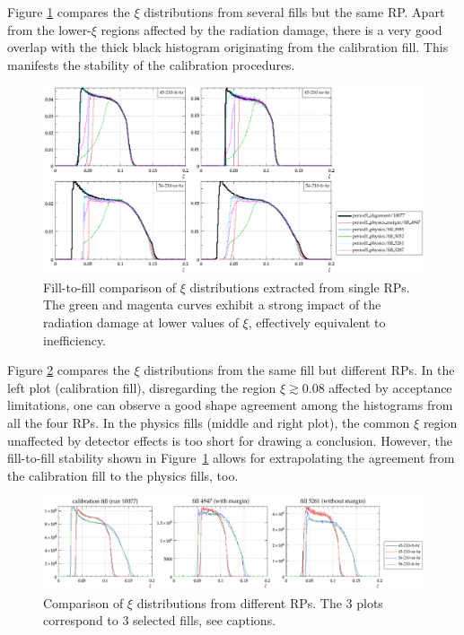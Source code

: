 \documentclass[TOTEM]{cern/cernphprep}
\begin{document}
Figure \ref{fig:xi_cmp_run} compares the $\xi$ distributions from several fills but the same RP. Apart from the lower-$\xi$ regions affected by the radiation damage, there is a very good overlap with the thick black histogram originating from the calibration fill. This manifests the stability of the calibration procedures.


\begin{figure}[h!]
\begin{center}
\includegraphics[width=\hsize]{fig/validation/xi_cmp_run.pdf}
\caption{%
Fill-to-fill comparison of $\xi$ distributions extracted from single RPs. The green and magenta curves exhibit a strong impact of the radiation damage at lower values of $\xi$, effectively equivalent to inefficiency.
}
\label{fig:xi_cmp_run}
\end{center}
\end{figure}


Figure \ref{fig:xi_cmp_rp} compares the $\xi$ distributions from the same fill but different RPs. In the left plot (calibration fill), disregarding the region $\xi\gtrsim 0.08$ affected by acceptance limitations, one can observe a good shape agreement among the histograms from all the four RPs. In the physics fills (middle and right plot), the common $\xi$ region unaffected by detector effects is too short for drawing a conclusion. However, the fill-to-fill stability shown in Figure~\ref{fig:xi_cmp_run} allows for extrapolating the agreement from the calibration fill to the physics fills, too.

\begin{figure}[h!]
\begin{center}
\includegraphics[width=\hsize]{fig/validation/xi_cmp_rp.pdf}
\caption{%
Comparison of $\xi$ distributions from different RPs. The 3 plots correspond to 3 selected fills, see captions.
}
\label{fig:xi_cmp_rp}
\end{center}
\end{figure}
\end{document}

